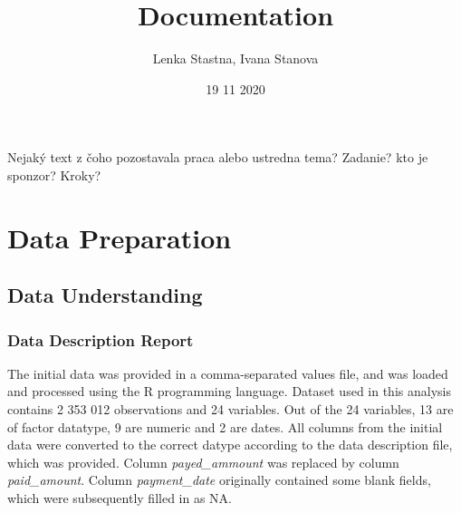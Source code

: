 \documentclass[
]{article}
\title{Documentation}
\author{Lenka Stastna, Ivana Stanova}
\date{19 11 2020}
\begin{document}
\maketitle

{
\setcounter{tocdepth}{2}
\tableofcontents
}
Nejaký text z čoho pozostavala praca alebo ustredna tema? Zadanie? kto je sponzor? Kroky?

\hypertarget{data-preparation}{%
\section{Data Preparation}\label{data-preparation}}

\hypertarget{data-understanding}{%
\subsection{Data Understanding}\label{data-understanding}}

\hypertarget{data-description-report}{%
\subsubsection{Data Description Report}\label{data-description-report}}

The initial data was provided in a comma-separated values file, and was loaded and processed using the R programming language. Dataset used in this analysis contains 2 353 012 observations and 24 variables. Out of the 24 variables, 13 are of factor datatype, 9 are numeric and 2 are dates.
All columns from the initial data were converted to the correct datype according to the data description file, which was provided. Column \emph{payed\_ammount} was replaced by column \emph{paid\_amount}. Column \emph{payment\_date} originally contained some blank fields, which were subsequently filled in as NA.
\end{document}
